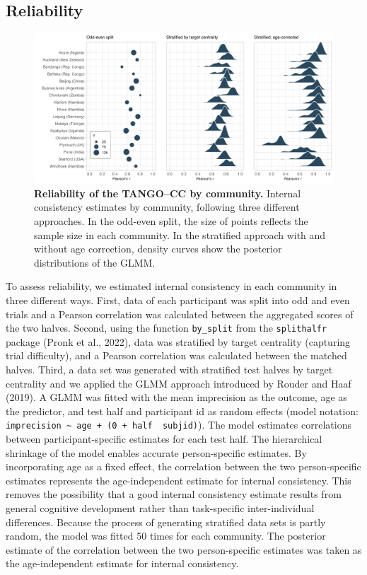 \documentclass[
  man,floatsintext]{apa7}
\begin{document}
\subsection{Reliability}\label{reliability}



\begin{figure}

{\centering \includegraphics[width=1\linewidth]{../figures/tango-cc-reli} 

}

\caption{\textbf{Reliability of the TANGO--CC by community.} Internal consistency estimates by community, following three different approaches. In the odd-even split, the size of points reflects the sample size in each community. In the stratified approach with and without age correction, density curves show the posterior distributions of the GLMM.}\label{fig:fig4}
\end{figure}

To assess reliability, we estimated internal consistency in each community in three different ways.
First, data of each participant was split into odd and even trials and a Pearson correlation was calculated between the aggregated scores of the two halves.
Second, using the function \texttt{by\_split} from the \texttt{splithalfr} package (Pronk et al., 2022), data was stratified by target centrality (capturing trial difficulty), and a Pearson correlation was calculated between the matched halves.
Third, a data set was generated with stratified test halves by target centrality and we applied the GLMM approach introduced by Rouder and Haaf (2019).
A GLMM was fitted with the mean imprecision as the outcome, age as the predictor, and test half and participant id as random effects (model notation: \texttt{imprecision\ \textasciitilde{}\ age\ +\ (0\ +\ half\ \textbar{}\ subjid)}).
The model estimates correlations between participant-specific estimates for each test half.
The hierarchical shrinkage of the model enables accurate person-specific estimates.
By incorporating age as a fixed effect, the correlation between the two person-specific estimates represents the age-independent estimate for internal consistency.
This removes the possibility that a good internal consistency estimate results from general cognitive development rather than task-specific inter-individual differences.
Because the process of generating stratified data sets is partly random, the model was fitted 50 times for each community.
The posterior estimate of the correlation between the two person-specific estimates was taken as the age-independent estimate for internal consistency.
\end{document}
